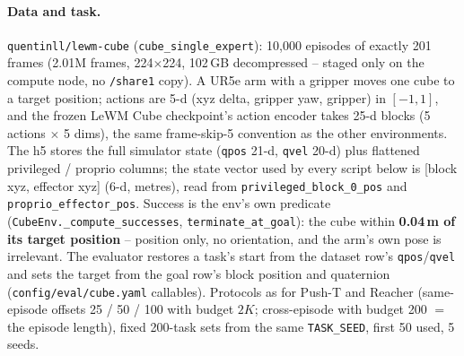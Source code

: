 \documentclass[11pt]{article}
\begin{document}
\paragraph{Data and task.} \texttt{quentinll/lewm-cube} (\texttt{cube\_single\_expert}):
10,000 episodes of exactly 201 frames (2.01M frames, 224$\times$224, 102\,GB decompressed --
staged only on the compute node, no \texttt{/share1} copy). A UR5e arm with a gripper moves one
cube to a target position; actions are 5-d (xyz delta, gripper yaw, gripper) in $[-1, 1]$, and
the frozen LeWM Cube checkpoint's action encoder takes 25-d blocks (5 actions $\times$ 5 dims),
the same frame-skip-5 convention as the other environments. The h5 stores the full simulator
state (\texttt{qpos} 21-d, \texttt{qvel} 20-d) plus flattened privileged / proprio columns;
the state vector used by every script below is [block xyz, effector xyz] (6-d, metres), read
from \texttt{privileged\_block\_0\_pos} and \texttt{proprio\_effector\_pos}. Success is the
env's own predicate (\texttt{CubeEnv.\_compute\_successes}, \texttt{terminate\_at\_goal}): the
cube within \textbf{0.04\,m of its target position} -- position only, no orientation, and
the arm's own pose is irrelevant. The evaluator restores a task's start from the dataset
row's \texttt{qpos}/\texttt{qvel} and sets the target from the goal row's block position and
quaternion (\texttt{config/eval/cube.yaml} callables). Protocols as for Push-T and Reacher
(same-episode offsets 25 / 50 / 100 with budget $2K$; cross-episode with budget 200 $=$ the
episode length), fixed 200-task sets from the same \texttt{TASK\_SEED}, first 50 used, 5 seeds.
\end{document}
